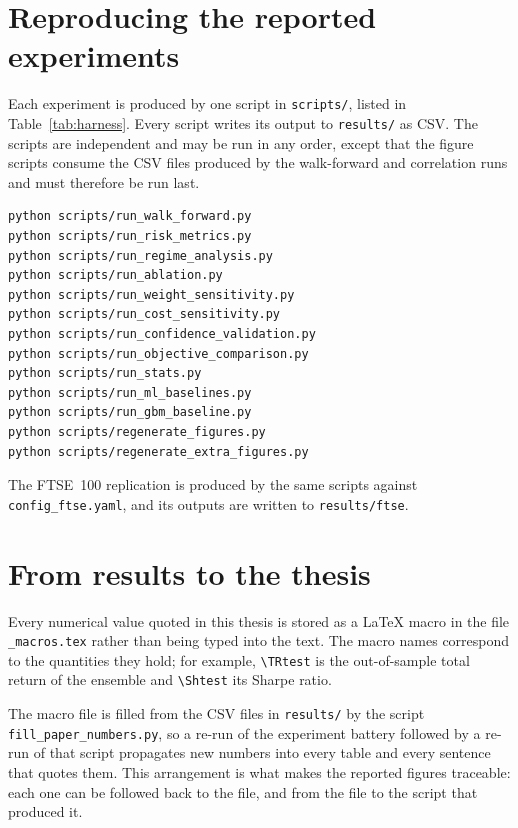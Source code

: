 \section{Reproducing the reported experiments}\label{app:experiments}

Each experiment is produced by one script in \texttt{scripts/}, listed in Table~\ref{tab:harness}. Every script writes its output to \texttt{results/} as CSV. The scripts are independent and may be run in any order, except that the figure scripts consume the CSV files produced by the walk-forward and correlation runs and must therefore be run last.

\begin{verbatim}
python scripts/run_walk_forward.py
python scripts/run_risk_metrics.py
python scripts/run_regime_analysis.py
python scripts/run_ablation.py
python scripts/run_weight_sensitivity.py
python scripts/run_cost_sensitivity.py
python scripts/run_confidence_validation.py
python scripts/run_objective_comparison.py
python scripts/run_stats.py
python scripts/run_ml_baselines.py
python scripts/run_gbm_baseline.py
python scripts/regenerate_figures.py
python scripts/regenerate_extra_figures.py
\end{verbatim}

\noindent
The FTSE~100 replication is produced by the same scripts against \texttt{config\_ftse.yaml}, and its outputs are written to \texttt{results/ftse}.

\section{From results to the thesis}\label{app:numbers}

Every numerical value quoted in this thesis is stored as a \LaTeX{} macro in the file \texttt{\_macros.tex} rather than being typed into the text. The macro names correspond to the quantities they hold; for example, \verb|\TRtest| is the out-of-sample total return of the ensemble and \verb|\Shtest| its Sharpe ratio.

The macro file is filled from the CSV files in \texttt{results/} by the script \texttt{fill\_paper\_numbers.py}, so a re-run of the experiment battery followed by a re-run of that script propagates new numbers into every table and every sentence that quotes them. This arrangement is what makes the reported figures traceable: each one can be followed back to the file, and from the file to the script that produced it.

